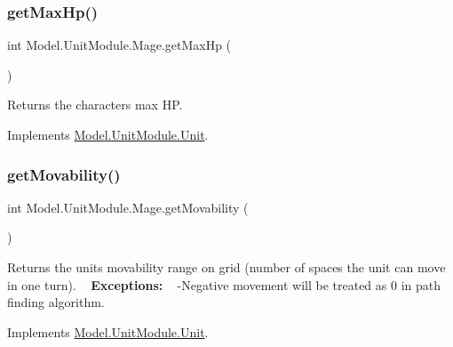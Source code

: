 \hypertarget{class_model_1_1_unit_module_1_1_mage_a3b3a869faa3d4014175b79c87d18c865}{}\label{class_model_1_1_unit_module_1_1_mage_a3b3a869faa3d4014175b79c87d18c865} 
\subsubsection{\texorpdfstring{get\+Max\+Hp()}{getMaxHp()}}
{\footnotesize\ttfamily int Model.\+Unit\+Module.\+Mage.\+get\+Max\+Hp (\begin{DoxyParamCaption}{ }\end{DoxyParamCaption})\hspace{0.3cm}{\ttfamily [inline]}}

Returns the character\textquotesingle{}s max HP. 

Implements \hyperlink{interface_model_1_1_unit_module_1_1_unit_adee907637c0ce8487149ae4549fb4cf1}{Model.\+Unit\+Module.\+Unit}.

\hypertarget{class_model_1_1_unit_module_1_1_mage_a85e20ef350f937c14e6de3362c0cdcfb}{}\label{class_model_1_1_unit_module_1_1_mage_a85e20ef350f937c14e6de3362c0cdcfb} 
\subsubsection{\texorpdfstring{get\+Movability()}{getMovability()}}
{\footnotesize\ttfamily int Model.\+Unit\+Module.\+Mage.\+get\+Movability (\begin{DoxyParamCaption}{ }\end{DoxyParamCaption})\hspace{0.3cm}{\ttfamily [inline]}}

Returns the unit\textquotesingle{}s movability range on grid (number of spaces the unit can move in one turn). ~\newline
{\bfseries Exceptions\+:} ~\newline
 -\/\+Negative movement will be treated as 0 in path finding algorithm. 

Implements \hyperlink{interface_model_1_1_unit_module_1_1_unit_a670aae31f46980c871774352f5fe3a3f}{Model.\+Unit\+Module.\+Unit}.

